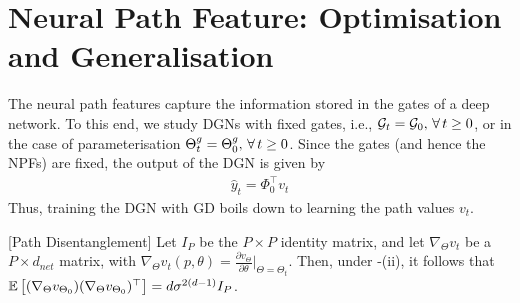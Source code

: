 \section{Neural Path Feature: Optimisation and Generalisation}
The neural path features capture the information stored in the gates of a deep network. To this end, we study DGNs with fixed gates, i.e., $\mathcal{G}_t=\mathcal{G}_0,\,\forall\,t\geq 0$, or in the case of parameterisation ${\Theta}^g_t={\Theta}^g_0,\,\forall\,t\geq 0$. Since the gates (and hence the NPFs) are fixed, the output of the DGN is given by 
\begin{align}\label{eq:fixednpf}
\hat{y}_t=\Phi^\top_0 v_t
\end{align}
Thus, training the DGN with GD boils down to learning the path values $v_t$. 
\begin{lemma}\label{lm:disentangle}[Path Disentanglement] Let $I_P$ be the $P\times P$ identity matrix, and let $\nabla_\Theta v_t$ be a $P\times d_{net}$ matrix, with $\nabla_\Theta v_t(p,\theta)=\frac{\partial v_{\Theta}}{\partial \theta}|_{\Theta=\Theta_t}$. Then, 
under -(ii), it follows that $\mathbb{E}\left[(\nabla_{\Theta}v_{\Theta_0})(\nabla_{\Theta}v_{\Theta_0})^\top \right]= d\sigma^{2(d-1)}I_{P}$.
\end{lemma}

